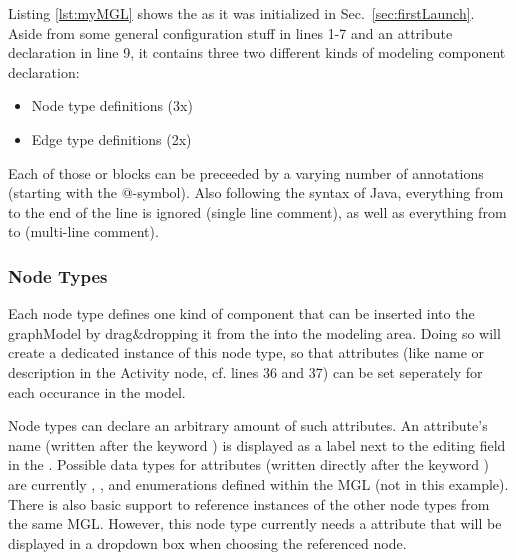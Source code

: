 \documentclass[a4paper,american,12pt]{scrreprt}
\begin{document}

Listing \ref{lst:myMGL} shows the  as it was initialized in
Sec.~\ref{sec:firstLaunch}. Aside from some general configuration stuff in lines
1-7 and an attribute declaration in line 9, it contains three two different kinds of modeling component declaration:
\begin{itemize}
\item Node type definitions (3x)
\item Edge type definitions (2x)
\end{itemize}

Each of those   or   blocks can be preceeded
by a varying number of annotations (starting with the @-symbol). Also following
the syntax of Java, everything from \code{//} to the end of the line is ignored
(single line comment), as well as everything from \code{/*} to \code{*/}
(multi-line comment).

\subsubsection{Node Types}

Each node type defines one kind of component that can be inserted into the
graphModel by drag\&dropping it from the  into the modeling area.
Doing so will create a dedicated instance of this node type, so that attributes
(like name or description in the Activity node, cf. lines 36 and 37) can be set
seperately for each occurance in the model.

Node types can declare an arbitrary amount of such attributes. An attribute's
name (written after the keyword ) is displayed as a label next to the
editing field in the . Possible data types for attributes
(written directly after the keyword ) are currently ,
,  and enumerations defined within the MGL (not in this
example). There is also basic support to reference instances of the other node
types from the same MGL. However, this node type currently needs a  attribute
that will be displayed in a dropdown box when choosing the referenced node.
\end{document}
